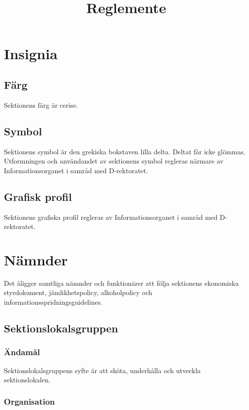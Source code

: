 \documentclass[a4paper,12pt]{article}
\title{Reglemente}
\begin{document}
\maketitle

\section{Insignia}

\subsection{Färg}

Sektionens färg är cerise.

\subsection{Symbol}

Sektionens symbol är den grekiska bokstaven lilla delta. Deltat får icke glömmas. Utformningen och användandet av sektionens symbol regleras närmare av Informationsorganet i samråd med D-rektoratet.

\subsection{Grafisk profil}

Sektionens grafiska profil regleras av Informationsorganet i samråd med D-rektoratet.

\section{Nämnder}

Det åligger samtliga nämnder och funktionärer att följa sektionens ekonomiska styrdokument, jämlikhetspolicy, alkoholpolicy och informationsspridningsguidelines.

\subsection{Sektionslokalsgruppen}

\subsubsection{Ändamål}

Sektionslokalsgruppens syfte är att sköta, underhålla och utveckla sektionslokalen.

\subsubsection{Organisation}
\end{document}
